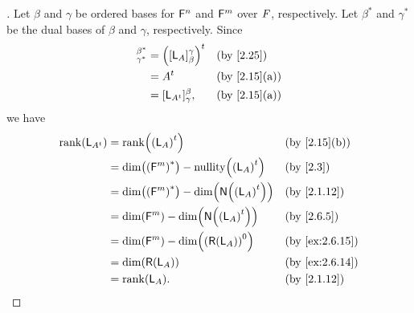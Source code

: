 \begin{proof}[]
  Let \(\beta\) and \(\gamma\) be ordered bases for \(\mathsf{F}^n\) and \(\mathsf{F}^m\) over \(\mathit{F}\), respectively.
  Let \(\beta^*\) and \(\gamma^*\) be the dual bases of \(\beta\) and \(\gamma\), respectively.
  Since
  \begin{align*}
    [\tp{\pa{\L_A}}]_{\gamma^*}^{\beta^*} & = \tp{\pa{[\L_A]_{\beta}^{\gamma}}} &  & \text{(by \cref{2.25})}    \\
                                          & = \tp{A}                            &  & \text{(by \cref{2.15}(a))} \\
                                          & = [\L_{\tp{A}}]_{\gamma}^{\beta},   &  & \text{(by \cref{2.15}(a))}
  \end{align*}
  we have
  \begin{align*}
    \rk{\L_{\tp{A}}} & = \rk{\tp{\pa{\L_A}}}                                     &  & \text{(by \cref{2.15}(b))}   \\
                     & = \dim\pa{\pa{\vs{F}^m}^*} - \nt{\tp{\pa{\L_A}}}          &  & \text{(by \cref{2.3})}       \\
                     & = \dim\pa{\pa{\vs{F}^m}^*} - \dim\pa{\ns{\tp{\pa{\L_A}}}} &  & \text{(by \cref{2.1.12})}    \\
                     & = \dim\pa{\vs{F}^m} - \dim\pa{\ns{\tp{\pa{\L_A}}}}        &  & \text{(by \cref{2.6.5})}     \\
                     & = \dim\pa{\vs{F}^m} - \dim\pa{\pa{\rg{\L_A}}^0}           &  & \text{(by \cref{ex:2.6.15})} \\
                     & = \dim\pa{\rg{\L_A}}                                      &  & \text{(by \cref{ex:2.6.14})} \\
                     & = \rk{\L_A}.                                              &  & \text{(by \cref{2.1.12})}
  \end{align*}
\end{proof}
